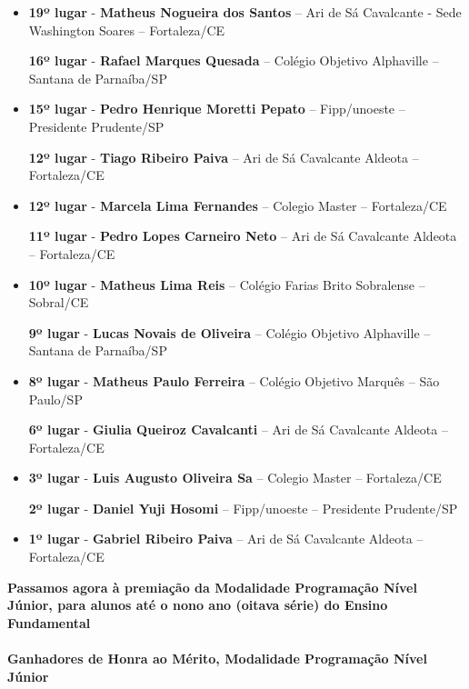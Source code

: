 \documentclass{article}
\begin{document}
\begin{itemize}
\item
\textbf{19º lugar} - \textbf{Matheus Nogueira dos Santos} – Ari de Sá Cavalcante - Sede Washington Soares – Fortaleza/CE


\textbf{16º lugar} - \textbf{Rafael Marques Quesada} – Colégio Objetivo Alphaville – Santana de Parnaíba/SP



\item
\textbf{15º lugar} - \textbf{Pedro Henrique Moretti Pepato} – Fipp/unoeste – Presidente Prudente/SP


\textbf{12º lugar} - \textbf{Tiago Ribeiro Paiva} – Ari de Sá Cavalcante Aldeota – Fortaleza/CE



\item
\textbf{12º lugar} - \textbf{Marcela Lima Fernandes} – Colegio Master – Fortaleza/CE


\textbf{11º lugar} - \textbf{Pedro Lopes Carneiro Neto} – Ari de Sá Cavalcante Aldeota – Fortaleza/CE



\item
\textbf{10º lugar} - \textbf{Matheus Lima Reis} – Colégio Farias Brito Sobralense – Sobral/CE


\textbf{9º lugar} - \textbf{Lucas Novais de Oliveira} – Colégio Objetivo Alphaville – Santana de Parnaíba/SP



\item
\textbf{8º lugar} - \textbf{Matheus Paulo Ferreira} – Colégio Objetivo Marquês – São Paulo/SP


\textbf{6º lugar} - \textbf{Giulia Queiroz Cavalcanti} – Ari de Sá Cavalcante Aldeota – Fortaleza/CE



\item
\textbf{3º lugar} - \textbf{Luis Augusto Oliveira Sa} – Colegio Master – Fortaleza/CE


\textbf{2º lugar} - \textbf{Daniel Yuji Hosomi} – Fipp/unoeste – Presidente Prudente/SP



\item
\textbf{1º lugar} - \textbf{Gabriel Ribeiro Paiva} – Ari de Sá Cavalcante Aldeota – Fortaleza/CE



\end{itemize}

\color{blue}
\textbf{Passamos agora à premiação da Modalidade Programação Nível Júnior, para alunos até o nono ano (oitava série) do Ensino Fundamental}\\\\
\textbf{\color{blue}Ganhadores de Honra ao Mérito, \color{black}Modalidade Programação Nível Júnior}
\color{black}
\end{document}
